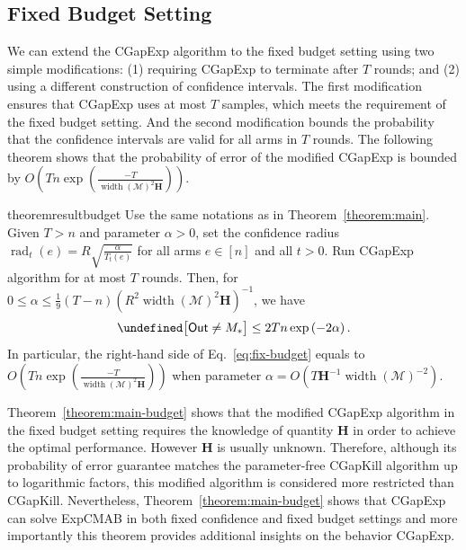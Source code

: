 \documentclass{article}
\newcommand{\Algorithm}{{\small \textsf{CGapExp}}\xspace}
\newcommand{\AlgorithmBud}{{\small \textsf{CGapKill}}\xspace}
\newcommand{\Problem}{{\small \textsf{ExpCMAB}}\xspace}
\newcommand{\Rew}{\varphi}
\newcommand{\M}{\mathcal M}
\newcommand{\B}{\mathcal B}
\newcommand{\RR}{\mathbb R}
\DeclareMathOperator{\rank}{width}
\DeclareMathOperator{\rad}{rad}
\newcommand{\out}{\mathsf{Out}}
\let\Pr\undefined
\DeclareMathOperator{\Pr}{Pr}
\newcommand{\MultiIdent}{\textsc{TopK}\xspace}
\renewcommand{\vec}[1]{\boldsymbol{#1}}
\begin{document}
\subsection{Fixed Budget Setting}
\label{section:fixed-budget}
We can extend the \Algorithm algorithm to the fixed budget setting using two simple modifications: (1) requiring \Algorithm to terminate after $T$ rounds; and (2) using a different construction of confidence intervals.
The first modification ensures that \Algorithm uses at most $T$ samples, which meets the requirement of the fixed budget setting.
And the second modification bounds the probability that the confidence intervals are valid for all arms in $T$ rounds.
The following theorem shows that the probability of error of the modified \Algorithm is bounded by 
$O\left(Tn\exp\left(\frac{-T}{\rank(\M)^2\mathbf H} \right)\right)$.
\begin{restatable}{theorem}{resultbudget}
Use the same notations as in Theorem~\ref{theorem:main}.
Given $T > n$ and parameter $\alpha > 0$, set the confidence radius $\rad_t(e) = R\sqrt{\frac{\alpha}{T_t(e)}}$ for all arms $e\in[n]$ and all $t>0$.
Run \Algorithm algorithm for at most $T$ rounds.
Then, for $0 \le \alpha \le \frac19 (T-n)\left(R^2\rank(\M)^2 \mathbf H\right)^{-1}$, we have
\begin{equation}
\label{eq:fix-budget}
\Pr\big[\out\not=M_*\big] \le 2Tn\exp\left(-2\alpha\right).
\end{equation}
In particular, the right-hand side of Eq.~\eqref{eq:fix-budget} equals to $O\left(Tn\exp\left(\frac{-T}{\rank(\M)^2\mathbf H} \right)\right)$
when parameter $\alpha = O(T\mathbf H^{-1}\rank(\M)^{-2})$.
\label{theorem:main-budget}
\end{restatable}

Theorem~\ref{theorem:main-budget} shows that the modified \Algorithm algorithm in the fixed budget setting requires the knowledge of  quantity $\mathbf H$ in order to achieve the optimal performance. 
However $\mathbf H$ is usually unknown.
Therefore, although its probability of error guarantee matches the parameter-free \AlgorithmBud algorithm up to logarithmic factors, this modified algorithm is considered more restricted than \AlgorithmBud. 
Nevertheless, Theorem~\ref{theorem:main-budget} shows that \Algorithm can solve \Problem in both fixed confidence and fixed budget settings  and more importantly this theorem provides additional insights on the behavior \Algorithm.
\end{document}
